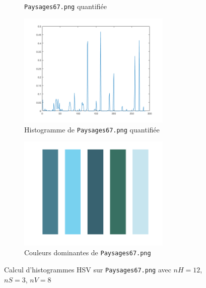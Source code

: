 \documentclass[a4paper]{article}
\begin{document}
\begin{figure}[H]
\begin{subfigure}[c]{0.46\textwidth}
        \caption{\texttt{Paysages67.png} quantifiée}
        \label{subfig:ex1_house}
    \end{subfigure}
    \begin{subfigure}[c]{0.46\textwidth}
        \centering
        \includegraphics[width=0.8\textwidth]{images/Paysages67_histo.png}
        \caption{Histogramme de \texttt{Paysages67.png} quantifiée}
    \end{subfigure}
    \begin{subfigure}[c]{0.46\textwidth}
        \centering
        \includegraphics[width=0.8\textwidth]{images/Paysages67_domi.png}
        \caption{Couleurs dominantes de \texttt{Paysages67.png}}
    \end{subfigure}

    \caption{Calcul d'histogrammes HSV sur \texttt{Paysages67.png} avec $nH=12$,
    $nS=3$, $nV=8$} 
    \label{fig:ex1_Paysages67}
\end{figure}
\end{document}
